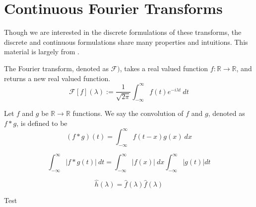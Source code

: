 \section{Continuous Fourier Transforms}
Though we are interested in the discrete formulations of these transforms,
the discrete and continuous formulations share 
many properties and intuitions.
This material is largely from \cite{Damelin2012}.

\begin{definition}
  The Fourier transform, denoted as $\mathcal{F})$,
  takes a real valued function $f: \mathbb{R} \rightarrow \mathbb{R}$,
  and returns a new real valued function.
  $$
  \mathcal{F}[f](\lambda) := \frac{1}{\sqrt{2 \pi}} \int_{-\infty}^{\infty} f(t) e^{-i \lambda t} \ dt
  $$
\end{definition}

\begin{definition}
  Let $f$ and $g$ be $\mathbb{R} \rightarrow \mathbb{R}$ functions. 
  We say the convolution of $f$ and $g$, 
  denoted as $f * g$, is defined to be
  $$
  (f * g)(t) = \int_{-\infty}^{\infty}f(t - x)g(x) \ dx
  $$
\end{definition}

\begin{lemma}
  $$
  \int_{-\infty}^{\infty} |f * g(t)| \ dt = \int_{-\infty}^{\infty} |f(x)| \ dx \int_{-\infty}^{\infty} | g(t) | dt
  $$
\end{lemma}

\begin{theorem}
$$
\hat{h}(\lambda) = \hat{f}(\lambda) \hat{f}(\lambda)
$$
\end{theorem}

\begin{theorem}
Test
\end{theorem}
